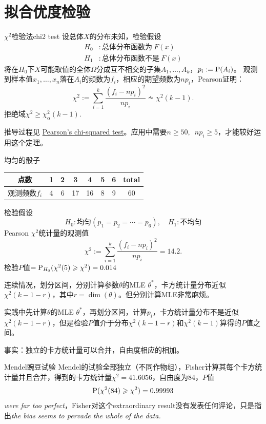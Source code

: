 \section{拟合优度检验}
\begin{theorem}{$\chi^2$检验法}{chi2 test}
	设总体$X$的分布未知，检验假设
	\begin{align*}
		H_0&:\text{总体分布函数为}~F(x)\\
		H_1&:\text{总体分布函数不是}~F(x)
	\end{align*}
	将在$H_0$下$X$可能取值的全体$\Omega$分成互不相交的子集$A_1,\ldots,A_k$，$p_i:=\P(A_i)$。
	观测到样本值$x_1,\ldots,x_n$落在$A_i$的频数为$f_i$，相应的期望频数为$np_i$，Pearson证明：
	\begin{equation}
		\chi^2:=\sum_{i=1}^k\frac{(f_i-np_i)^2}{np_i}\dotsim\chi^2(k-1).
	\end{equation}
	拒绝域$\chi^2\geqslant\chi^2_\alpha(k-1).$
\end{theorem}
推导过程见 \href{https://en.wikipedia.org/wiki/Pearson%27s_chi-squared_test}{Pearson's chi-squared test}。应用中需要$n\geqslant 50,\enspace np_i\geqslant 5$，才能较好运用这个定理。
\begin{example}{均匀的骰子}{}
	\begin{center}
		\begin{tabular}{cccccccc}
			\toprule
			点数&1&2&3&4&5&6&total\\
			\midrule
			观测频数$f_i$&4&6&17&16&8&9&60\\
			\bottomrule
		\end{tabular}
	\end{center}
	检验假设
	\[
		H_0:\text{均匀}(p_1=p_2=\cdots=p_6),\quad H_1:\text{不均匀}
	\]
	Pearson $\chi^2$统计量的观测值
	\[
		\chi^2:=\sum_{i=1}^k\frac{(f_i-np_i)^2}{np_i}=14.2.
	\]
	检验$P$值$=\P_{H_0}(\chi^2(5)\geqslant\chi^2)=0.014$
\end{example}
连续情况，划分区间，分别计算参数$\theta$的MLE $\theta^\ast$，卡方统计量分布近似$\chi^2(k-1-r)$，其中$r=\dim(\theta)$。但分别计算MLE非常麻烦。

实践中先计算$\theta$的MLE $\theta^\ast$，再划分区间，计算$p_i$，卡方统计量分布不是近似$\chi^2(k-1-r)$，但是检验$P$值介于分布$\chi^2(k-1-r)$和$\chi^2(k-1)$算得的$P$值之间。

事实：独立的卡方统计量可以合并，自由度相应的相加。
\begin{example}{Mendel豌豆试验}{}
	Mendel的试验全部独立（不同作物组），Fisher计算其每个卡方统计量并且合并，得到的卡方统计量$\chi^2=41.6056$，自由度为84，$P$值
	\[
		\P(\chi^2(84)\geqslant\chi^2)=0.99993
	\]
	\textit{were far too perfect}，Fisher对这个extraordinary result没有发表任何评论，只是指出\textit{the bias seems to pervade the whole of the data.}
\end{example}
